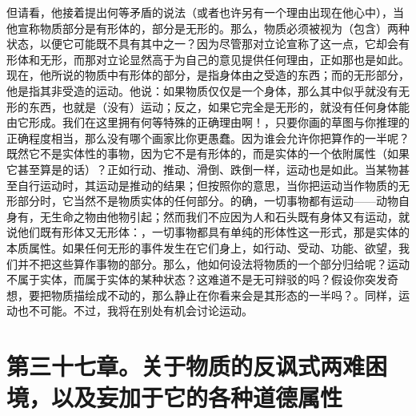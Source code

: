 但请看，他接着提出何等矛盾的说法（或者也许另有一个理由出现在他心中），当他宣称物质部分是有形体的，部分是无形的。那么，物质必须被视为（包含）两种状态，以便它可能既不具有其中之一？因为尽管那对立论宣称了这一点，它却会有形体和无形，而那对立论显然高于为自己的意见提供任何理由，正如那也是如此。现在，他所说的物质中有形体的部分，是指身体由之受造的东西；而的无形部分，他是指其非受造的运动。他说：如果物质仅仅是一个身体，那么其中似乎就没有无形的东西，也就是（没有）运动；反之，如果它完全是无形的，就没有任何身体能由它形成。我们在这里拥有何等特殊的正确理由啊！，只要你画的草图与你推理的正确程度相当，那么没有哪个画家比你更愚蠢。因为谁会允许你把算作的一半呢？既然它不是实体性的事物，因为它不是有形体的，而是实体的一个依附属性（如果它甚至算是的话）？正如行动、推动、滑倒、跌倒一样，运动也是如此。当某物甚至自行运动时，其运动是推动的结果；但按照你的意思，当你把运动当作物质的无形部分时，它当然不是物质实体的任何部分。的确，一切事物都有运动——动物自身有，无生命之物由他物引起；然而我们不应因为人和石头既有身体又有运动，就说他们既有形体又无形体：，一切事物都具有单纯的形体性这一形式，那是实体的本质属性。如果任何无形的事件发生在它们身上，如行动、受动、功能、欲望，我们并不把这些算作事物的部分。那么，他如何设法将物质的一个部分归给呢？运动不属于实体，而属于实体的某种状态？这难道不是无可辩驳的吗？假设你突发奇想，要把物质描绘成不动的，那么静止在你看来会是其形态的一半吗？。同样，运动也不可能。不过，我将在别处有机会讨论运动。\par


\section{第三十七章。关于物质的反讽式两难困境，以及妄加于它的各种道德属性}

